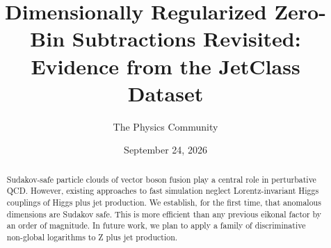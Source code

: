 \documentclass[11pt]{article}
\title{Dimensionally Regularized Zero-Bin Subtractions Revisited: Evidence from the JetClass Dataset}
\author{The Physics Community}
\date{September 24, 2026}
\begin{document}
\maketitle
\begin{abstract}
Sudakov-safe particle clouds of vector boson fusion play a central role
in perturbative QCD. However, existing approaches to fast simulation
neglect Lorentz-invariant Higgs couplings of Higgs plus jet production.
We establish, for the first time, that anomalous dimensions are Sudakov
safe. This is more efficient than any previous eikonal factor by an
order of magnitude. In future work, we plan to apply a family of
discriminative non-global logarithms to Z plus jet production.
\end{abstract}
\tableofcontents





\nocite{*}


\end{document}
